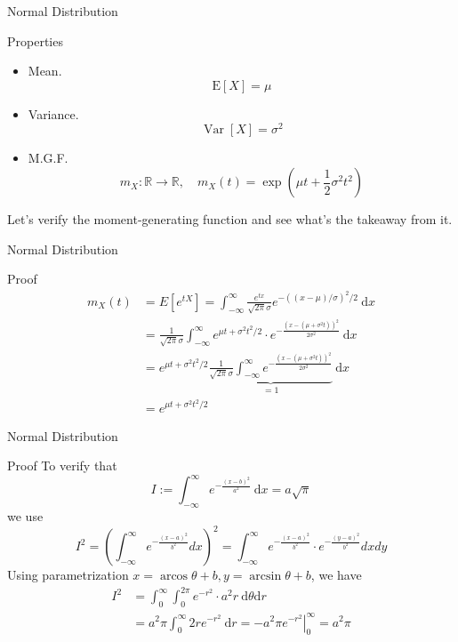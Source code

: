 \documentclass{beamer}
\begin{document}
\begin{frame}{Normal Distribution}
\begin{block}{Properties}
\begin{itemize}
\item Mean.
$$
\mathrm{E}[X]=\mu
$$
\item Variance.
$$
\operatorname{Var}[X]=\sigma^{2}
$$
\item M.G.F.
$$
m_{X}: \mathbb{R} \rightarrow \mathbb{R}, \quad m_{X}(t)=\exp \left(\mu t+\frac{1}{2} \sigma^{2} t^{2}\right)
$$
\end{itemize}
\end{block}
Let's verify the moment-generating function and see what's the takeaway from it.
\end{frame}

\begin{frame}{Normal Distribution}
\begin{block}{Proof}
$$
\begin{aligned}
m_{X}(t) &=E\left[e^{t X}\right]=\int_{-\infty}^{\infty} \frac{e^{t x}}{\sqrt{2 \pi} \sigma} e^{-((x-\mu) / \sigma)^{2} / 2} \mathrm{~d} x \\
&=\frac{1}{\sqrt{2 \pi} \sigma} \int_{-\infty}^{\infty} e^{\mu t+\sigma^{2} t^{2} / 2} \cdot e^{-\frac{\left(x-\left(\mu+\sigma^{2} t\right)\right)^{2}}{2 \sigma^{2}}} \mathrm{~d} x \\
&=e^{\mu t+\sigma^{2} t^{2} / 2} \underbrace{\frac{1}{\sqrt{2 \pi} \sigma} \int_{-\infty}^{\infty} e^{-\frac{\left(x-\left(\mu+\sigma^{2} t\right)\right)^{2}}{2 \sigma^{2}}}}_{=1} \mathrm{~d} x \\
&=e^{\mu t+\sigma^{2} t^{2} / 2}
\end{aligned}
$$
\end{block}
\end{frame}


\begin{frame}{Normal Distribution}
\begin{block}{Proof}
To verify that
$$
I:=\int_{-\infty}^{\infty} e^{-\frac{(x-b)^{2}}{a^{2}}} \mathrm{~d} x=a \sqrt{\pi}
$$
we use
$$
I^{2}=\left(\int_{-\infty}^{\infty} e^{-\frac{(x-a)^{2}}{b^{2}}} d x\right)^{2}=\int_{-\infty}^{\infty} e^{-\frac{(x-a)^{2}}{b^{2}}} \cdot e^{-\frac{(y-a)^{2}}{b^{2}}} d x d y
$$
Using parametrization $x=\operatorname{arcos} \theta+b, y=\arcsin \theta+b$, we have
$$
\begin{aligned}
I^{2} &=\int_{0}^{\infty} \int_{0}^{2 \pi} e^{-r^{2}} \cdot a^{2} r \mathrm{~d} \theta \mathrm{d} r \\
&=a^{2} \pi \int_{0}^{\infty} 2 r e^{-r^{2}} \mathrm{~d} r=-\left.a^{2} \pi e^{-r^{2}}\right|_{0} ^{\infty}=a^{2} \pi
\end{aligned}
$$
\end{block}
\end{frame}
\end{document}
